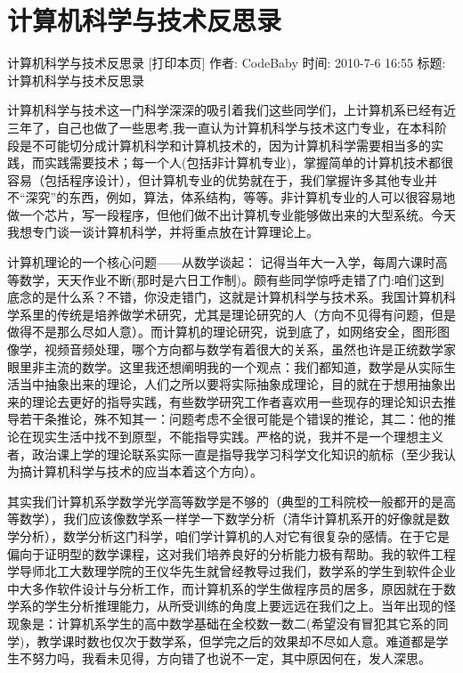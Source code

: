 \chapter{计算机科学与技术反思录}

计算机科学与技术反思录 [打印本页]
作者: CodeBaby    时间: 2010-7-6 16:55     标题: 计算机科学与技术反思录

计算机科学与技术这一门科学深深的吸引着我们这些同学们，上计算机系已经有近三年了，自己也做了一些思考,我一直认为计算机科学与技术这门专业，在本科阶段是不可能切分成计算机科学和计算机技术的，因为计算机科学需要相当多的实践，而实践需要技术；每一个人(包括非计算机专业)，掌握简单的计算机技术都很容易（包括程序设计），但计算机专业的优势就在于，我们掌握许多其他专业并不“深究”的东西，例如，算法，体系结构，等等。非计算机专业的人可以很容易地做一个芯片，写一段程序，但他们做不出计算机专业能够做出来的大型系统。今天我想专门谈一谈计算机科学，并将重点放在计算理论上。

计算机理论的一个核心问题——从数学谈起：
记得当年大一入学，每周六课时高等数学，天天作业不断(那时是六日工作制)。颇有些同学惊呼走错了门:咱们这到底念的是什么系？不错，你没走错门，这就是计算机科学与技术系。我国计算机科学系里的传统是培养做学术研究，尤其是理论研究的人（方向不见得有问题，但是做得不是那么尽如人意）。而计算机的理论研究，说到底了，如网络安全，图形图像学，视频音频处理，哪个方向都与数学有着很大的关系，虽然也许是正统数学家眼里非主流的数学。这里我还想阐明我的一个观点：我们都知道，数学是从实际生活当中抽象出来的理论，人们之所以要将实际抽象成理论，目的就在于想用抽象出来的理论去更好的指导实践，有些数学研究工作者喜欢用一些现存的理论知识去推导若干条推论，殊不知其一：问题考虑不全很可能是个错误的推论，其二：他的推论在现实生活中找不到原型，不能指导实践。严格的说，我并不是一个理想主义者，政治课上学的理论联系实际一直是指导我学习科学文化知识的航标（至少我认为搞计算机科学与技术的应当本着这个方向）。

其实我们计算机系学数学光学高等数学是不够的（典型的工科院校一般都开的是高等数学），我们应该像数学系一样学一下数学分析（清华计算机系开的好像就是数学分析），数学分析这门科学，咱们学计算机的人对它有很复杂的感情。在于它是偏向于证明型的数学课程，这对我们培养良好的分析能力极有帮助。我的软件工程学导师北工大数理学院的王仪华先生就曾经教导过我们，数学系的学生到软件企业中大多作软件设计与分析工作，而计算机系的学生做程序员的居多，原因就在于数学系的学生分析推理能力，从所受训练的角度上要远远在我们之上。当年出现的怪现象是：计算机系学生的高中数学基础在全校数一数二(希望没有冒犯其它系的同学)，教学课时数也仅次于数学系，但学完之后的效果却不尽如人意。难道都是学生不努力吗，我看未见得，方向错了也说不一定，其中原因何在，发人深思。

